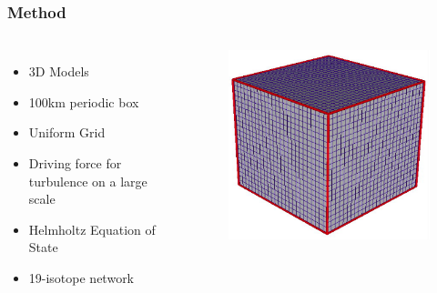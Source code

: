 \documentclass{beamer}
\begin{document}

\begin{frame}
\frametitle{Method}

\begin{columns}[c]
        \begin{itemize}
                \item 3D Models
                \item 100km periodic box
		\item Uniform Grid
		\item Driving force for turbulence on a large scale
		\item Helmholtz Equation of State
		\item 19-isotope network
        \end{itemize}


        \vspace{25pt}
        \begin{figure}
    \begin{center}
      \includegraphics[width=.90\linewidth]{grid.png}
    \end{center}
  \end{figure}

        \end{columns}

\end{frame}


\end{document}
